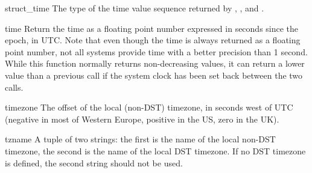 \begin{datadesc}{struct_time}
The type of the time value sequence returned by ,
, and .
\end{datadesc}

\begin{funcdesc}{time}{}
Return the time as a floating point number expressed in seconds since
the epoch, in UTC.  Note that even though the time is always returned
as a floating point number, not all systems provide time with a better
precision than 1 second.  While this function normally returns
non-decreasing values, it can return a lower value than a previous
call if the system clock has been set back between the two calls.
\end{funcdesc}

\begin{datadesc}{timezone}
The offset of the local (non-DST) timezone, in seconds west of UTC
(negative in most of Western Europe, positive in the US, zero in the
UK).
\end{datadesc}

\begin{datadesc}{tzname}
A tuple of two strings: the first is the name of the local non-DST
timezone, the second is the name of the local DST timezone.  If no DST
timezone is defined, the second string should not be used.
\end{datadesc}


\begin{seealso}
\end{seealso}
